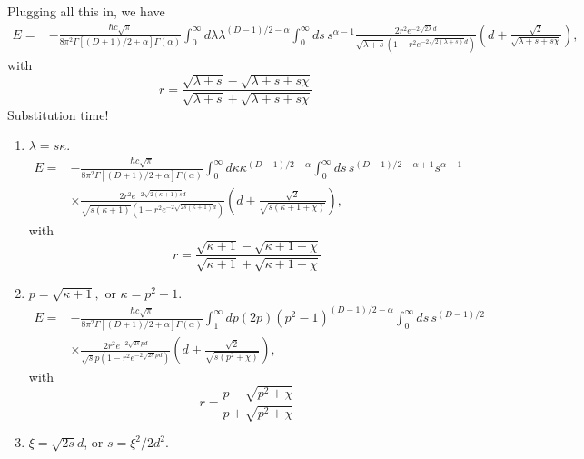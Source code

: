 Plugging all this in, we have 
\begin{align}
E  =& - \frac{\hbar c\sqrt{\pi}}{8\pi^2\Gamma[(D+1)/2+\alpha]\Gamma(\alpha)} 
\int_0^\infty d\lambda \lambda^{(D-1)/2-\alpha}\int_0^\infty ds\, s^{\alpha-1}
\frac{2r^2 e^{-2\sqrt{2\lambda}d}}{\sqrt{\lambda+s}(1-r^2 e^{-2\sqrt{2(\lambda+s)}d})}
\left( d + \frac{\sqrt{2}}{\sqrt{\lambda+s+s\chi}} \right),
\end{align}
with 
\begin{equation}
r = \frac{ \sqrt{\lambda+s} - \sqrt{\lambda+s+s\chi}}{ \sqrt{\lambda+s} + \sqrt{\lambda+s+s\chi}}
\end{equation}
Substitution time!
\begin{enumerate}
\item $\lambda = s\kappa$.
\begin{align}
E  =& - \frac{\hbar c\sqrt{\pi}}{8\pi^2\Gamma[(D+1)/2+\alpha]\Gamma(\alpha)} \int_0^\infty d\kappa 
\kappa^{(D-1)/2-\alpha}\int_0^\infty ds\, s^{(D-1)/2-\alpha+1} s^{\alpha-1}\nonumber\\
&\times \frac{2r^2 e^{-2\sqrt{2(\kappa+1)s}d}}{\sqrt{s(\kappa+1)}(1-r^2 e^{-2\sqrt{2s(\kappa+1)}d})}
\left( d + \frac{\sqrt{2}}{\sqrt{s(\kappa+1+\chi)}} \right),
\end{align}
with 
\begin{equation}
r = \frac{ \sqrt{\kappa+1} - \sqrt{\kappa+1+\chi}}{ \sqrt{\kappa+1} + \sqrt{\kappa+1+\chi}}
\end{equation}
\item $p = \sqrt{\kappa+1},$ or $\kappa = p^2-1$. 
\begin{align}
E  =& - \frac{\hbar c\sqrt{\pi}}{8\pi^2\Gamma[(D+1)/2+\alpha]\Gamma(\alpha)} \int_1^\infty dp (2p) 
(p^2-1)^{(D-1)/2-\alpha}\int_0^\infty ds\, s^{(D-1)/2}\nonumber\\
&\times \frac{2r^2 e^{-2\sqrt{2s}pd}}{\sqrt{s}p(1-r^2 e^{-2\sqrt{2s}pd})}
\left( d + \frac{\sqrt{2}}{\sqrt{s(p^2+\chi)}} \right),
\end{align}
with 
\begin{equation}
r = \frac{ p - \sqrt{p^2+\chi}}{ p + \sqrt{p^2+\chi}}
\end{equation}
\item $\xi = \sqrt{2s} d$, or $s = \xi^2/2 d^2$.  


\end{enumerate}

